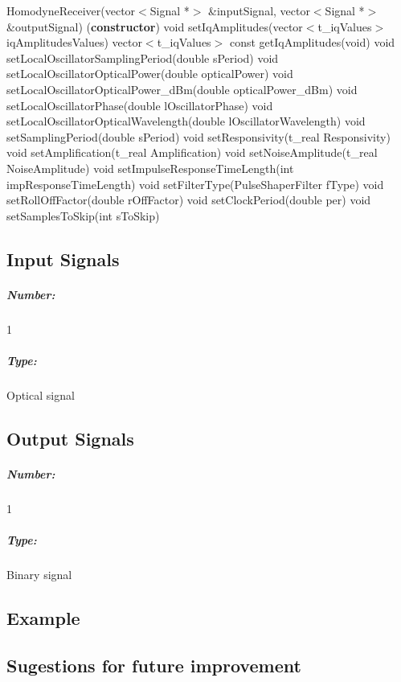 HomodyneReceiver(vector$<$Signal *$>$ \&inputSignal, vector$<$Signal *$>$ \&outputSignal) (\textbf{constructor})
\bigbreak
void setIqAmplitudes(vector$<$t\_iqValues$>$ iqAmplitudesValues)
\bigbreak
vector$<$t\_iqValues$>$ const getIqAmplitudes(void)
\bigbreak
void setLocalOscillatorSamplingPeriod(double sPeriod)
\bigbreak
void setLocalOscillatorOpticalPower(double opticalPower)
\bigbreak
void setLocalOscillatorOpticalPower\_dBm(double opticalPower\_dBm)
\bigbreak
void setLocalOscillatorPhase(double lOscillatorPhase)
\bigbreak
void setLocalOscillatorOpticalWavelength(double lOscillatorWavelength)
\bigbreak
void setSamplingPeriod(double sPeriod)
\bigbreak
void  setResponsivity(t\_real Responsivity)
\bigbreak
void setAmplification(t\_real Amplification)
\bigbreak
void setNoiseAmplitude(t\_real NoiseAmplitude)
\bigbreak
void setImpulseResponseTimeLength(int impResponseTimeLength)
\bigbreak
void setFilterType(PulseShaperFilter fType)
\bigbreak
void setRollOffFactor(double rOffFactor)
\bigbreak
void setClockPeriod(double per)
\bigbreak
void setSamplesToSkip(int sToSkip)

\pagebreak

\subsection*{Input Signals}

\subparagraph*{Number:} 1

\subparagraph*{Type:} Optical signal

\subsection*{Output Signals}

\subparagraph*{Number:} 1

\subparagraph*{Type:} Binary signal

\subsection*{Example}

\subsection*{Sugestions for future improvement}
